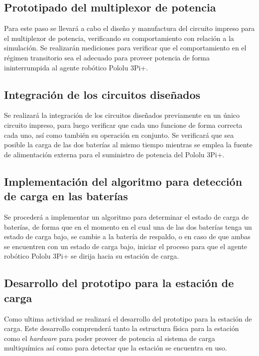 \subsection*{Prototipado del multiplexor de potencia}

Para este paso se llevará a cabo el diseño y manufactura del circuito impreso
para el multiplexor de potencia, verificando su comportamiento con relación a 
la simulación. Se realizarán mediciones para verificar que el comportamiento 
en el régimen transitorio sea el adecuado para proveer potencia de forma 
ininterrumpida al agente robótico Pololu 3Pi+.

\subsection*{Integración de los circuitos diseñados}

Se realizará la integración de los circuitos diseñados previamente en un 
único circuito impreso, para luego verificar que cada uno funcione de forma
correcta cada uno, así como también su operación en conjunto. Se verificará
que sea posible la carga de las dos baterías al mismo tiempo mientras se
emplea la fuente de alimentación externa para el suministro de potencia del
Pololu 3Pi+.

\subsection*{Implementación del algoritmo para detección de carga en las baterías}

Se procederá a implementar un algoritmo para determinar el estado de carga de baterías,
de forma que en el momento en el cual una de las dos baterías tenga un estado de carga bajo,
se cambie a la batería de respaldo, o en caso de que ambas se encuentren con un estado de 
carga bajo, iniciar el proceso para que el agente robótico Pololu 3Pi+ se dirija hacia su 
estación de carga.

\subsection*{Desarrollo del prototipo para la estación de carga}

Como ultima actividad se realizará el desarrollo del prototipo para la estación de carga. 
Este desarrollo comprenderá tanto la estructura física para la estación como el \textit{hardware}
para poder proveer de potencia al sistema de carga multiquímica así como para detectar que la 
estación se encuentra en uso. 



